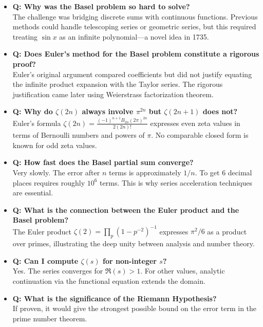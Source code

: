 \begin{itemize}
\item \textbf{Q: Why was the Basel problem so hard to solve?} \\
The challenge was bridging discrete sums with continuous functions. Previous methods could handle telescoping series or geometric series, but this required treating $\sin x$ as an infinite polynomial---a novel idea in 1735.

\item \textbf{Q: Does Euler's method for the Basel problem constitute a rigorous proof?} \\
Euler's original argument compared coefficients but did not justify equating the infinite product expansion with the Taylor series. The rigorous justification came later using Weierstrass factorization theorem.

\item \textbf{Q: Why do $\zeta(2n)$ always involve $\pi^{2n}$ but $\zeta(2n+1)$ does not?} \\
Euler's formula $\zeta(2n) = \frac{(-1)^{n+1} B_{2n} (2\pi)^{2n}}{2(2n)!}$ expresses even zeta values in terms of Bernoulli numbers and powers of $\pi$. No comparable closed form is known for odd zeta values.

\item \textbf{Q: How fast does the Basel partial sum converge?} \\
Very slowly. The error after $n$ terms is approximately $1/n$. To get 6 decimal places requires roughly $10^6$ terms. This is why series acceleration techniques are essential.

\item \textbf{Q: What is the connection between the Euler product and the Basel problem?} \\
The Euler product $\zeta(2) = \prod_p (1 - p^{-2})^{-1}$ expresses $\pi^2/6$ as a product over primes, illustrating the deep unity between analysis and number theory.

\item \textbf{Q: Can I compute $\zeta(s)$ for non-integer $s$?} \\
Yes. The series converges for $\Re(s) > 1$. For other values, analytic continuation via the functional equation extends the domain.

\item \textbf{Q: What is the significance of the Riemann Hypothesis?} \\
If proven, it would give the strongest possible bound on the error term in the prime number theorem.
\end{itemize}

